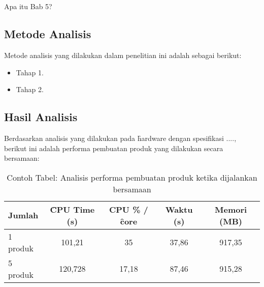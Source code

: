 \chapter{\babLima}
\label{bab:5}
Apa itu Bab 5?



\section{Metode Analisis}
\label{sec:method}
Metode analisis yang dilakukan dalam penelitian ini adalah sebagai berikut:
\begin{itemize}
	\item Tahap 1.
	\item Tahap 2.
\end{itemize}


\section{Hasil Analisis}
\label{sec:analisis}
Berdasarkan analisis yang dilakukan pada \f{hardware} dengan spesifikasi ...., berikut ini adalah performa pembuatan produk yang dilakukan secara bersamaan:
\begin{table}
	\centering
	\begin{tabular}{|l|c|c|c|c|}
		\hline
		Jumlah   & \f{CPU Time} (s) & CPU \% / \f{core} & Waktu (s) & Memori (MB) \\ \hline
		1 produk & 101,21           & 35                & 37,86     & 917,35      \\ \hline
		5 produk & 120,728          & 17,18             & 87,46     & 915,28      \\ \hline
	\end{tabular}
	\caption{Contoh Tabel: Analisis performa pembuatan produk ketika dijalankan bersamaan}
	\label{table:sample}
\end{table}

